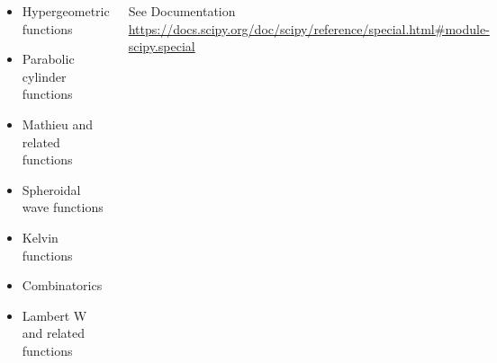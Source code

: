 \begin{frame}[fragile]
\begin{columns}[T]
\begin{itemize}
\begin{itemize}
	\item Hypergeometric functions
	\item Parabolic cylinder functions
	\item Mathieu and related functions
	\item Spheroidal wave functions
	\item Kelvin functions
	\item Combinatorics
	\item Lambert W and related functions
\end{itemize}
\end{itemize}
%
See Documentation\\
	\scriptsize \url{https://docs.scipy.org/doc/scipy/reference/special.html#module-scipy.special}
\end{columns}
%
\end{frame}


